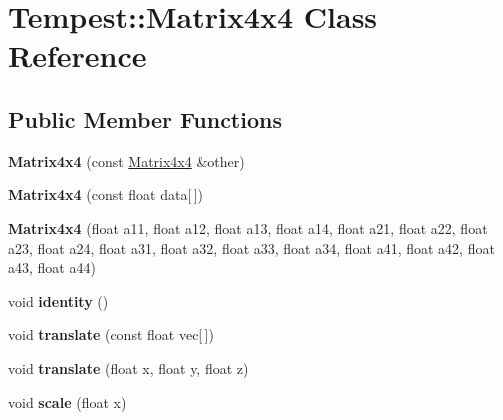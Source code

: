 \hypertarget{class_tempest_1_1_matrix4x4}{\section{Tempest\+:\+:Matrix4x4 Class Reference}
\label{class_tempest_1_1_matrix4x4}
}
\subsection*{Public Member Functions}
\begin{DoxyCompactItemize}
\item 
\hypertarget{class_tempest_1_1_matrix4x4_a4a71d8fc881ddb7d51577e0a762ac186}{{\bfseries Matrix4x4} (const \hyperlink{class_tempest_1_1_matrix4x4}{Matrix4x4} \&other)}\label{class_tempest_1_1_matrix4x4_a4a71d8fc881ddb7d51577e0a762ac186}

\item 
\hypertarget{class_tempest_1_1_matrix4x4_acb5988e6580b533bfea670dd5d658c4e}{{\bfseries Matrix4x4} (const float data\mbox{[}$\,$\mbox{]})}\label{class_tempest_1_1_matrix4x4_acb5988e6580b533bfea670dd5d658c4e}

\item 
\hypertarget{class_tempest_1_1_matrix4x4_ac872cd887e1ded8021624820bb5f6841}{{\bfseries Matrix4x4} (float a11, float a12, float a13, float a14, float a21, float a22, float a23, float a24, float a31, float a32, float a33, float a34, float a41, float a42, float a43, float a44)}\label{class_tempest_1_1_matrix4x4_ac872cd887e1ded8021624820bb5f6841}

\item 
\hypertarget{class_tempest_1_1_matrix4x4_a78079d6b21850f5cdcd6ae070b1ecf22}{void {\bfseries identity} ()}\label{class_tempest_1_1_matrix4x4_a78079d6b21850f5cdcd6ae070b1ecf22}

\item 
\hypertarget{class_tempest_1_1_matrix4x4_a884fbed6f645d3eaa1302a5ea628f436}{void {\bfseries translate} (const float vec\mbox{[}$\,$\mbox{]})}\label{class_tempest_1_1_matrix4x4_a884fbed6f645d3eaa1302a5ea628f436}

\item 
\hypertarget{class_tempest_1_1_matrix4x4_a8080a79986f5761b17e9e767e047e9ce}{void {\bfseries translate} (float x, float y, float z)}\label{class_tempest_1_1_matrix4x4_a8080a79986f5761b17e9e767e047e9ce}

\item 
\hypertarget{class_tempest_1_1_matrix4x4_af18cb2baff8de6198d821424937ece8a}{void {\bfseries scale} (float x)}\label{class_tempest_1_1_matrix4x4_af18cb2baff8de6198d821424937ece8a}


\end{DoxyCompactItemize}
